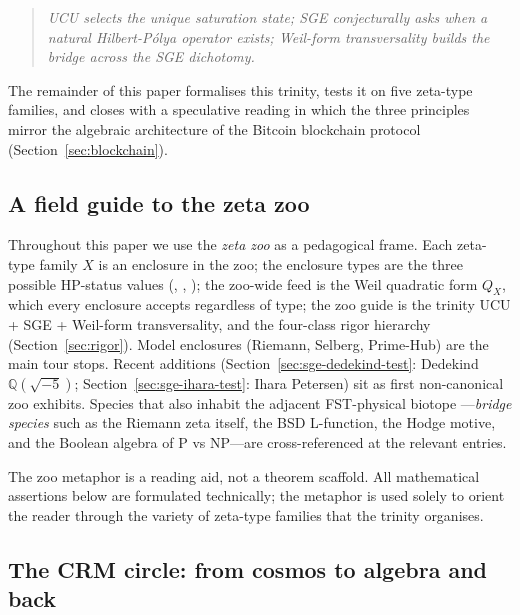 \documentclass[11pt]{article}
\theoremstyle{definition}
\theoremstyle{remark}
\begin{document}
\begin{quote}
\emph{UCU selects the unique saturation state; SGE conjecturally asks when
a natural Hilbert-P\'olya operator exists; Weil-form transversality
builds the bridge across the SGE dichotomy.}
\end{quote}

The remainder of this paper formalises this trinity, tests it on
five zeta-type families, and closes with a speculative reading in
which the three principles mirror the algebraic architecture of the
Bitcoin blockchain protocol (Section~\ref{sec:blockchain}).

\subsection{A field guide to the zeta zoo}
\label{sec:zoo-framing}

Throughout this paper we use the \emph{zeta zoo} as a pedagogical
frame. Each zeta-type family $X$ is an enclosure in the zoo; the
enclosure types are the three possible HP-status values
(, , ); the zoo-wide feed is the Weil
quadratic form $Q_X$, which every enclosure accepts regardless of
type; the zoo guide is the trinity UCU + SGE + Weil-form
transversality, and the four-class rigor hierarchy
(Section~\ref{sec:rigor}). Model enclosures (Riemann, Selberg,
Prime-Hub) are the main tour stops. Recent additions
(Section~\ref{sec:sge-dedekind-test}: Dedekind
$\mathbb{Q}(\sqrt{-5})$; Section~\ref{sec:sge-ihara-test}: Ihara
Petersen) sit as first non-canonical zoo exhibits. Species that
also inhabit the adjacent FST-physical biotope
\cite{RFEPFramework}---\emph{bridge species} such as the Riemann
zeta itself, the BSD L-function, the Hodge motive, and the Boolean
algebra of P vs NP---are cross-referenced at the relevant entries.

The zoo metaphor is a reading aid, not a theorem scaffold. All
mathematical assertions below are formulated technically; the
metaphor is used solely to orient the reader through the variety
of zeta-type families that the trinity organises.

\subsection{The CRM circle: from cosmos to algebra and back}
\label{sec:crm-circle}
\end{document}

